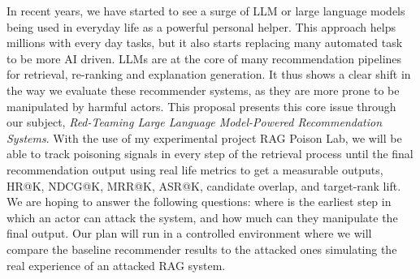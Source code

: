 In recent years, we have started to see a surge of LLM or large language models being used in everyday life as a powerful personal helper. This approach helps millions with every day tasks, but it also starts replacing many automated task to be more AI driven. LLMs are at the core of many recommendation pipelines for retrieval, re-ranking and explanation generation. It thus shows a clear shift in the way we evaluate these recommender systems, as they are more prone to be manipulated by harmful actors. This proposal presents this core issue through our subject, \emph{Red-Teaming Large Language Model-Powered Recommendation Systems}. With the use of my experimental project RAG Poison Lab, we will be able to track poisoning signals in every step of the retrieval process until the final recommendation output\cite{ragpoisonlab_repo} using real life metrics to get a measurable outputs, HR@K, NDCG@K, MRR@K, ASR@K, candidate overlap, and target-rank lift. We are hoping to answer the following questions: where is the earliest step in which an actor can attack the system, and how much can they manipulate the final output. Our plan will run in a controlled environment where we will compare the baseline recommender results to the attacked ones simulating the real experience of an attacked RAG system.